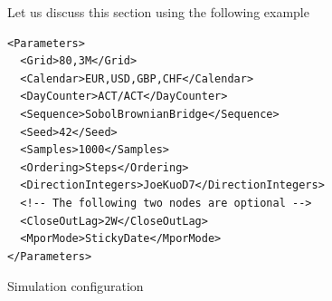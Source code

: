 \documentclass[12pt, a4paper]{article}
\begin{document}
{Let us discuss this section using the following example

\begin{listing}[H]
\begin{verbatim}
<Parameters>
  <Grid>80,3M</Grid>
  <Calendar>EUR,USD,GBP,CHF</Calendar>
  <DayCounter>ACT/ACT</DayCounter>
  <Sequence>SobolBrownianBridge</Sequence>
  <Seed>42</Seed>
  <Samples>1000</Samples>
  <Ordering>Steps</Ordering>
  <DirectionIntegers>JoeKuoD7</DirectionIntegers>
  <!-- The following two nodes are optional -->
  <CloseOutLag>2W</CloseOutLag>
  <MporMode>StickyDate</MporMode>
</Parameters>
\end{verbatim}
\caption{Simulation configuration}
\label{lst:simulation_params_configuration}
\end{listing}

}
\end{document}
